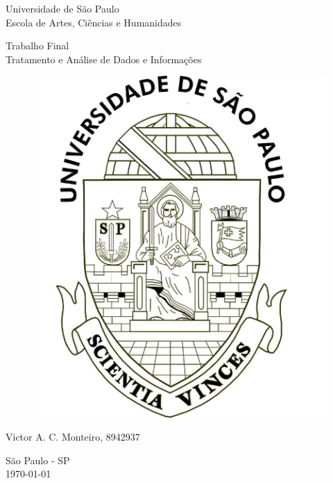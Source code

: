 \vspace*{5cm}
{
\begin{center}
    \large
    \hspace*{7cm}Universidade de São Paulo \\
    \hspace*{0cm}Escola de Artes, Ciências e Humanidades \\
\end{center}}

\vspace{1.0cm}
\noindent
\begin{center}
    {\Large Trabalho Final} \\ [2cm]
    {\Large Tratamento e Análise de Dados e Informações} \\[2cm]
    
    \begin{figure}[h]
        \leavevmode
        \begin{minipage}[t]{\textwidth}
            \center
            \includegraphics[scale=0.18]{capa/brasao.jpg}
        \end{minipage}
    \end{figure}
    \vspace{3cm}
    {\Large Victor A. C. Monteiro, 8942937}\\[0.2cm]
\end{center}

\vspace{3cm}
{\center São Paulo - SP \\[3mm]
\today \\}

\newpage